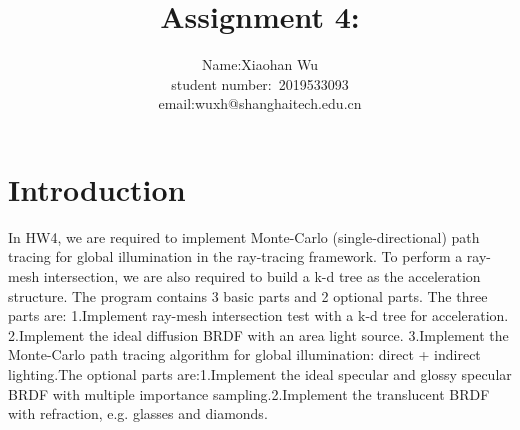 \documentclass[acmtog]{acmart}
\title{Assignment 4:\\ {}}
\author{Name:\quad Xiaohan Wu  \\ student number:\ 2019533093
\\email:\quad wuxh@shanghaitech.edu.cn}
\begin{document}
\maketitle

\vspace*{2 ex}

\section{Introduction}
\qquad In HW4, we are required to implement Monte-Carlo (single-directional) path tracing for global illumination in the ray-tracing framework. To perform a ray-mesh intersection, we are also required to build a k-d tree as the acceleration structure. The program contains 3 basic parts and 2 optional parts. The three parts are: 1.Implement ray-mesh intersection test with a k-d tree for acceleration. 
2.Implement the ideal diffusion BRDF with an area light source. 
3.Implement the Monte-Carlo path tracing algorithm for global illumination: direct + indirect lighting.The optional parts are:1.Implement the ideal specular and glossy specular BRDF with multiple importance sampling.2.Implement the translucent BRDF with refraction, e.g. glasses and diamonds.
\end{document}
